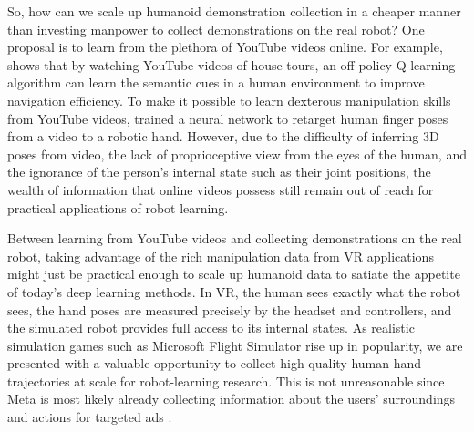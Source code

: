 So, how can we scale up humanoid demonstration collection in a cheaper manner than investing manpower to collect demonstrations on the real robot? 
One proposal is to learn from the plethora of YouTube videos online. 
For example, \cite{chang2020semantic} shows that by watching YouTube videos of house tours, an off-policy Q-learning algorithm can learn the semantic cues in a human environment to improve navigation efficiency. To make it possible to learn dexterous manipulation skills from YouTube videos, \cite{sivakumar2022robotic} trained a neural network to retarget human finger poses from a video to a robotic hand. 
However, due to the difficulty of inferring 3D poses from video, the lack of proprioceptive view from the eyes of the human, and the ignorance of the person's internal state such as their joint positions, the wealth of information that online videos possess still remain out of reach for practical applications of robot learning. 

Between learning from YouTube videos and collecting demonstrations on the real robot, taking advantage of the rich manipulation data from VR applications might just be practical enough to scale up humanoid data to satiate the appetite of today's deep learning methods. In VR, the human sees exactly what the robot sees, the hand poses are measured precisely by the headset and controllers, and the simulated robot provides full access to its internal states. As realistic simulation games such as Microsoft Flight Simulator rise up in popularity, we are presented with a valuable opportunity to collect high-quality human hand trajectories at scale for robot-learning research. This is not unreasonable since Meta is most likely already collecting information about the users' surroundings and actions for targeted ads \cite{oculus-privacy}.
